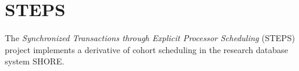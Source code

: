 \documentclass[12pt,a4paper]{book}
\begin{document}
\section{STEPS}\label{ch:relwork:steps}

The \emph{Synchronized Transactions through Explicit Processor Scheduling} (STEPS) project implements a derivative of cohort scheduling in the research database system SHORE.~\cite{shore}
\end{document}

